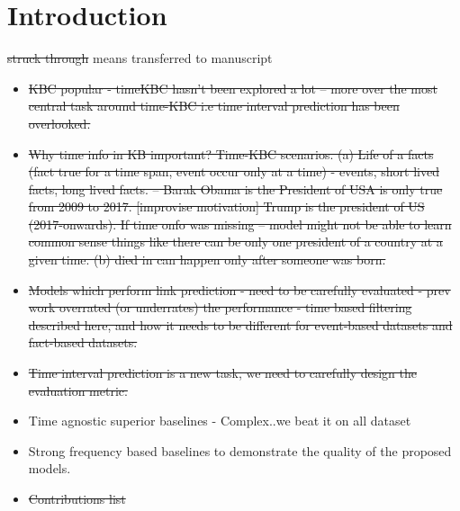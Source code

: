 \documentclass[12pt,a4paper]{article}
\begin{document}
\section{Introduction}
\sout{struck through} means transferred to manuscript
\begin{itemize}
    \item \sout{KBC popular - timeKBC hasn't been explored a lot -- more over the most central task around time-KBC i.e time interval prediction has been overlooked.}

    \item \sout{Why time info in KB important?
    Time-KBC scenarios. (a) Life of a facts 
    (fact true for a time span, event occur only at a time) - events, short lived facts, long lived facts. -- Barak Obama is the President of USA is only true from 2009 to 2017. [improvise motivation]
    Trump is the president of US (2017-onwards). If time onfo was missing -- model might not be able to learn common sense things like there can be only one president of a country at a given time.      (b) died in can happen only after someone was born.}
    
    \item \sout{Models which perform link prediction - need to be carefully evaluated - prev work overrated (or underrates) the performance - time based filtering described here, and how it needs to be different for event-based datasets and fact-based datasets.}
    
    \item \sout{Time interval prediction is a new task, we need to carefully design the evaluation metric.}

    \item Time agnostic superior baselines - Complex..we beat it on all dataset



    \item Strong frequency based baselines to demonstrate the quality of the proposed models.
    
    \item \sout{Contributions list}
\end{itemize}
\end{document}
